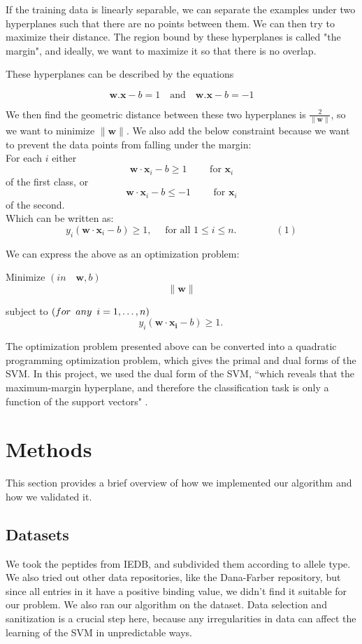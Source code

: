 \documentclass[journal]{IEEEtran}
\begin{document}
If the training data is linearly separable, we can separate the examples under two hyperplanes such that there are no points between them. We can then try to maximize their distance. The region bound by these hyperplanes is called "the margin", and ideally, we want to maximize it so that there is no overlap.

These hyperplanes can be described by the equations


$$
    \mathbf{w}.\mathbf{x} - b = 1    \quad \textrm{and} \quad 
    \mathbf{w}.\mathbf{x} - b = -1
$$

We then find the geometric distance between these two hyperplanes is $\tfrac{2}{\|\mathbf{w}\|}$, so we want to minimize $\|\mathbf{w}\|$. We also add the below constraint because we want to prevent the data points from falling under the margin:\\ 

For each $i$ either
$$\mathbf{w}\cdot\mathbf{x}_i - b \ge 1\qquad\text{ for }\mathbf{x}_i$$ 
of the first class, or
$$\mathbf{w}\cdot\mathbf{x}_i - b \le -1\qquad\text{ for }\mathbf{x}_i$$ 
of the second.  \\  

Which can be written as:
$$
    y_i(\mathbf{w}\cdot\mathbf{x}_i - b) \ge 1, \quad \text{ for all } 1 \le i \le n.\qquad\qquad(1)
$$

We can express the above as an optimization problem:

Minimize $(in \quad {\mathbf{w},b})$
$$   
 \|\mathbf{w}\|
$$
 
subject to $(for \enskip any \enskip i = 1, \dots, n)$
$$
y_i(\mathbf{w}\cdot\mathbf{x_i} - b) \ge 1. \,
$$

The optimization problem presented above can be converted into a quadratic programming optimization problem, which gives the primal and dual forms of the SVM. In this project, we used the dual form of the SVM, ``which reveals that the maximum-margin hyperplane, and therefore the classification task is only a function of the support vectors" \cite{WikipediaSVM}.


\section{Methods}
This section provides a brief overview of how we implemented our algorithm and how we validated it.

\subsection{Datasets}
We took the peptides from IEDB, and subdivided them according to allele type. We also tried out other data repositories, like the Dana-Farber \cite{DanaFarber} repository, but since all entries in it have a positive binding value, we didn't find it suitable for our problem. We also ran our algorithm on the dataset. Data selection and sanitization is a crucial step here, because any irregularities in data can affect the learning of the SVM in unpredictable ways.
\end{document}
